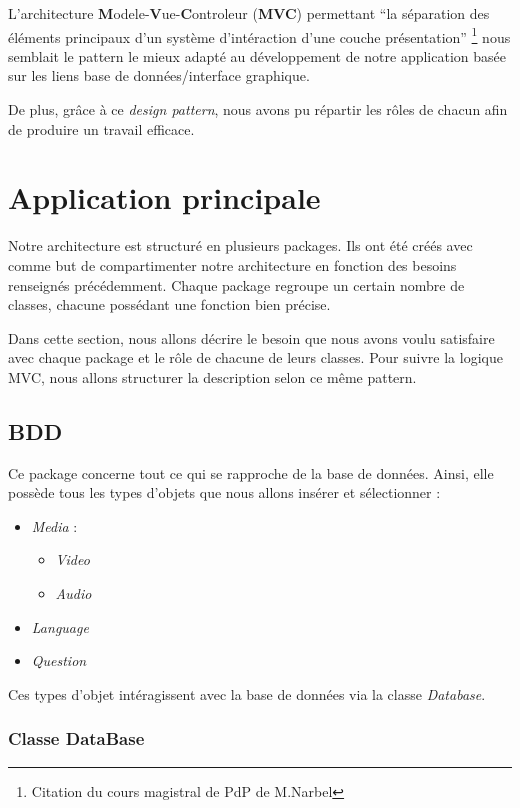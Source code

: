 L'architecture \textbf{M}odele-\textbf{V}ue-\textbf{C}ontroleur (\textbf{MVC}) permettant ``la séparation des éléments principaux d'un système d'intéraction d'une couche présentation'' \footnote{Citation du cours magistral de PdP de M.Narbel} nous semblait le pattern le mieux adapté au développement de notre application basée sur les liens base de données/interface graphique. 

De plus, grâce à ce \textit{design pattern}, nous avons pu répartir les rôles de chacun afin de produire un travail efficace.

\section{Application principale}

Notre architecture est structuré en plusieurs packages. Ils ont été créés avec comme but de compartimenter notre architecture en fonction des besoins renseignés précédemment. Chaque package regroupe un certain nombre de classes, chacune possédant une fonction bien précise.

Dans cette section, nous allons décrire le besoin que nous avons voulu satisfaire avec chaque package et le rôle de chacune de leurs classes. Pour suivre la logique MVC, nous allons structurer la description selon ce même pattern.


\subsection{BDD}

Ce package concerne tout ce qui se rapproche de la base de données. Ainsi, elle possède tous les types d'objets que nous allons insérer et sélectionner :
\begin{itemize}
 \item \textit{Media} :
 \begin{itemize}
  \item \textit{Video}
  \item \textit{Audio}
 \end{itemize}
 \item \textit{Language}
 \item \textit{Question}
\end{itemize}
Ces types d'objet intéragissent avec la base de données via la classe \textit{Database}.


\subsubsection{Classe DataBase}

